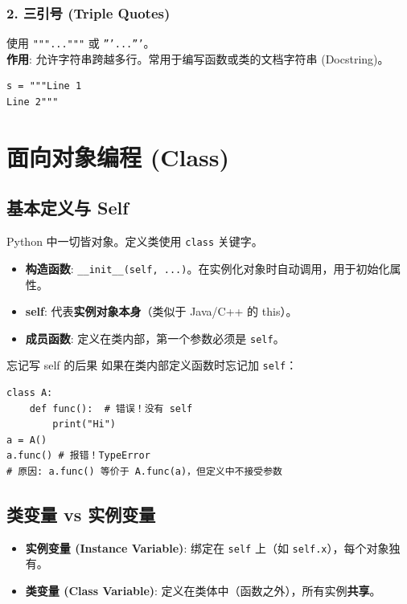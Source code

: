 \documentclass[12pt, a4paper]{article}
\begin{document}
\subsubsection{2. 三引号 (Triple Quotes)}
使用 \texttt{"""..."""} 或 \texttt{'''...'''}。
\\ \textbf{作用}: 允许字符串跨越多行。常用于编写函数或类的文档字符串 (Docstring)。
\begin{lstlisting}
s = """Line 1
Line 2"""
\end{lstlisting}

\section{面向对象编程 (Class)}

\subsection{基本定义与 Self}

Python 中一切皆对象。定义类使用 \texttt{class} 关键字。

\begin{itemize}
    \item \textbf{构造函数}: \texttt{\_\_init\_\_(self, ...)}。在实例化对象时自动调用，用于初始化属性。
    \item \textbf{self}: 代表\textbf{实例对象本身}（类似于 Java/C++ 的 this）。
    \item \textbf{成员函数}: 定义在类内部，第一个参数必须是 \texttt{self}。
\end{itemize}

\begin{trapbox}{忘记写 self 的后果}
如果在类内部定义函数时忘记加 \texttt{self}：
\begin{lstlisting}
class A:
    def func():  # 错误！没有 self
        print("Hi")
a = A()
a.func() # 报错！TypeError
# 原因: a.func() 等价于 A.func(a)，但定义中不接受参数
\end{lstlisting}
\end{trapbox}

\subsection{类变量 vs 实例变量}

\begin{itemize}
    \item \textbf{实例变量 (Instance Variable)}: 绑定在 \texttt{self} 上（如 \texttt{self.x}），每个对象独有。
    \item \textbf{类变量 (Class Variable)}: 定义在类体中（函数之外），所有实例\textbf{共享}。
\end{itemize}
\end{document}
